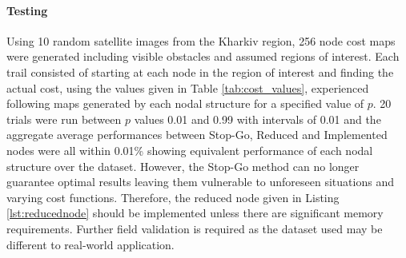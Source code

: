 \paragraph{Testing}
Using 10 random satellite images from the Kharkiv region, 256 node cost maps were generated including visible obstacles and assumed regions of interest. Each trail consisted of starting at each node in the region of interest and finding the actual cost, using the values given in Table \ref{tab:cost_values}, experienced following maps generated by each nodal structure for a specified value of $p$. 20 trials were run between $p$ values 0.01 and 0.99 with intervals of 0.01 and the aggregate average performances between Stop-Go, Reduced and Implemented nodes were all within 0.01\% showing equivalent performance of each nodal structure over the dataset. However, the Stop-Go method can no longer guarantee optimal results leaving them vulnerable to unforeseen situations and varying cost functions. Therefore, the reduced node given in Listing \ref{lst:reducednode} should be implemented unless there are significant memory requirements. Further field validation is required as the dataset used may be different to real-world application.

